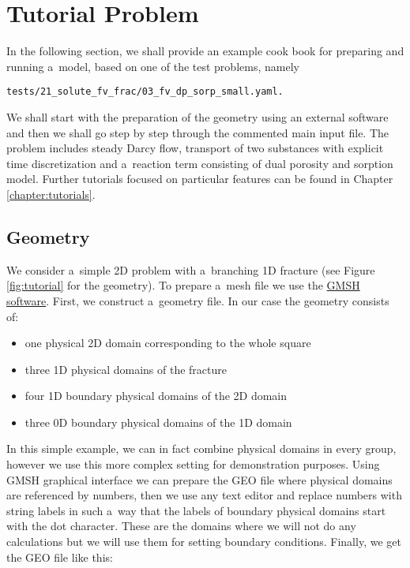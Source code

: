 

\section{Tutorial Problem}
In the following section, we shall provide an example cook book for preparing and running a~model,
based on one of the test problems, namely
\begin{verbatim}
tests/21_solute_fv_frac/03_fv_dp_sorp_small.yaml.
\end{verbatim}
We shall start with the preparation of the geometry using an external software and then we shall go step by step through the 
commented main input file. The problem includes steady Darcy flow, transport of two substances with explicit
time discretization and a~reaction term consisting of dual porosity and sorption model.
Further tutorials focused on particular features can be found in Chapter \ref{chapter:tutorials}.

\subsection{Geometry}
We consider a~simple 2D problem with a~branching 1D fracture (see Figure \ref{fig:tutorial} for the geometry). 
To prepare a~mesh file we use the \href{http://geuz.org/gmsh/}{GMSH software}.
First, we construct a~geometry file. In our case the geometry consists of: 
\begin{itemize}
 \item one physical 2D domain corresponding to the whole square
 \item three 1D physical domains of the fracture
 \item four 1D boundary physical domains of the 2D domain
 \item three 0D boundary physical domains of the 1D domain
\end{itemize}
In this simple example, we can in fact combine physical domains in every group, however we use this more complex setting for
demonstration purposes. Using GMSH graphical interface we can prepare the GEO file where physical domains are referenced by numbers, then we use 
any text editor and replace numbers with string labels in such a~way that the labels of boundary physical domains start with the dot character. 
These are the domains where we will not do any calculations but we will use them for setting boundary conditions.
Finally, we get the GEO file like this:

